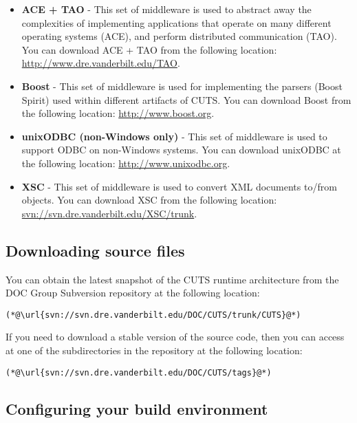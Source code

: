 \begin{itemize} 
  \item \textbf{ACE + TAO} - This set of middleware is used to abstract away the 
  complexities of implementing applications that operate on many different operating
  systems (ACE), and perform distributed communication (TAO). You can download ACE + TAO
  from the following location: \url{http://www.dre.vanderbilt.edu/TAO}.

  \item \textbf{Boost} - This set of middleware is used for implementing the parsers 
  (Boost Spirit) used within different artifacts of CUTS. You can download Boost from
  the following location: \url{http://www.boost.org}.

  \item \textbf{unixODBC (non-Windows only)} - This set of middleware is used to  
  support ODBC on non-Windows systems. You can download unixODBC at the following
  location: \url{http://www.unixodbc.org}.

  \item \textbf{XSC} - This set of middleware is used to convert XML documents 
  to/from objects. You can download XSC from the following location: 
  \url{svn://svn.dre.vanderbilt.edu/XSC/trunk}.

\end{itemize}

\subsection{Downloading source files}
\label{sec:install-download-runtime}

You can obtain the latest snapshot of the CUTS runtime architecture from the
DOC Group Subversion repository at the following location:

\begin{lstlisting}
(*@\url{svn://svn.dre.vanderbilt.edu/DOC/CUTS/trunk/CUTS}@*)
\end{lstlisting}

If you need to download a stable version of the source code, then you can 
access at one of the subdirectories in the repository at the following location:

\begin{lstlisting}
(*@\url{svn://svn.dre.vanderbilt.edu/DOC/CUTS/tags}@*)
\end{lstlisting}

\subsection{Configuring your build environment}

